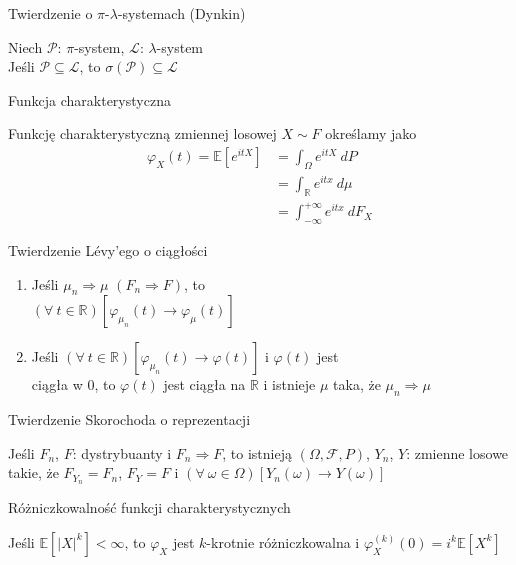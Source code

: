 \documentclass[avery5371,grid,frame]{flashcards}
\begin{document}
\begin{flashcard}[Twierdzenie]{Twierdzenie o $\pi$-$\lambda$-systemach (Dynkin)}

\smallskip
Niech $\mathcal{P}$: $\pi$-system, $\mathcal{L}$: $\lambda$-system \\
Jeśli $\mathcal{P} \subseteq \mathcal{L}$, to $\sigma(\mathcal{P}) \subseteq \mathcal{L}$
\end{flashcard}

\begin{flashcard}[Definicja]{Funkcja charakterystyczna}

\smallskip
Funkcję charakterystyczną zmiennej losowej $X \sim F$ określamy jako
{\begin{align*}
\varphi_X(t) = \mathbb{E} \left[ e^{itX} \right] &= \int_{\Omega} e^{itX} \ dP \\
             &= \int_{\mathbb{R}} e^{itx} \ d \mu \\
             &= \int_{-\infty}^{+\infty} e^{itx} \ dF_X 
\end{align*}}
\end{flashcard}

\begin{flashcard}[Twierdzenie]{Twierdzenie Lévy'ego o ciągłości}

\smallskip
\begin{enumerate}
\item Jeśli $\mu_n \Rightarrow \mu$ $(F_n \Rightarrow F)$, to \\ 
$(\forall \ t \in \mathbb{R})\left[\varphi_{\mu_n}(t) \rightarrow \varphi_\mu(t) \right]$
\item Jeśli $(\forall \ t \in \mathbb{R})\left[\varphi_{\mu_n}(t) \rightarrow \varphi(t) \right]$ i $\varphi(t)$ jest \\ ciągła w $0$, to $\varphi(t)$ jest ciągła na $\mathbb{R}$ i istnieje $\mu$ taka, że $\mu_n \Rightarrow \mu$
\end{enumerate}
\end{flashcard}

\begin{flashcard}[Twierdzenie]{Twierdzenie Skorochoda o reprezentacji}

\smallskip
Jeśli $F_n$, $F$: dystrybuanty i $F_n \Rightarrow F$, to istnieją $\left( \Omega, \mathcal{F}, P \right)$, $Y_n$, $Y$: zmienne losowe takie, że $F_{Y_n} = F_n$, $F_Y=F$ i $(\forall \ \omega \in \Omega)[Y_n(\omega) \rightarrow Y(\omega)]$
\end{flashcard}

\begin{flashcard}[Twierdzenie]{Różniczkowalność funkcji charakterystycznych}

\smallskip
Jeśli $\mathbb{E} \left[ |X|^k \right] < \infty$, to $\varphi_X$ jest $k$-krotnie różniczkowalna i $\varphi^{(k)}_X(0) = i^k \mathbb{E}[X^k]$
\end{flashcard}
\end{document}
